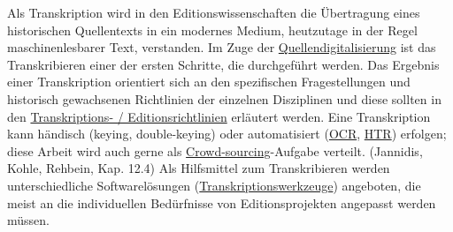 \documentclass{article}
\begin{document}
    Als Transkription wird in den Editionswissenschaften die Übertragung eines
                  historischen Quellentexts in ein modernes Medium, heutzutage in der Regel
                  maschinenlesbarer Text, verstanden. Im Zuge der \href{http://gams.uni-graz.at/o:konde.60}{Quellendigitalisierung} ist das Transkribieren einer
                  der ersten Schritte, die durchgeführt werden. Das Ergebnis einer Transkription
                  orientiert sich an den spezifischen Fragestellungen und historisch gewachsenen
                  Richtlinien der einzelnen Disziplinen und diese sollten in den \href{http://gams.uni-graz.at/o:konde.198}{Transkriptions- /
                     Editionsrichtlinien} erläutert werden. Eine Transkription kann händisch
                  (keying, double-keying) oder automatisiert (\href{http://gams.uni-graz.at/o:konde.149}{OCR}, \href{http://gams.uni-graz.at/o:konde.224}{HTR}) erfolgen; diese Arbeit wird auch gerne als \href{http://gams.uni-graz.at/o:konde.47}{Crowd-sourcing}-Aufgabe verteilt. (Jannidis, Kohle, Rehbein, Kap. 12.4)
                  Als Hilfsmittel zum Transkribieren werden unterschiedliche Softwarelösungen (\href{http://gams.uni-graz.at/o:konde.199}{Transkriptionswerkzeuge}) angeboten,
                  die meist an die individuellen Bedürfnisse von Editionsprojekten angepasst werden
                  müssen. \\
            
\end{document}
